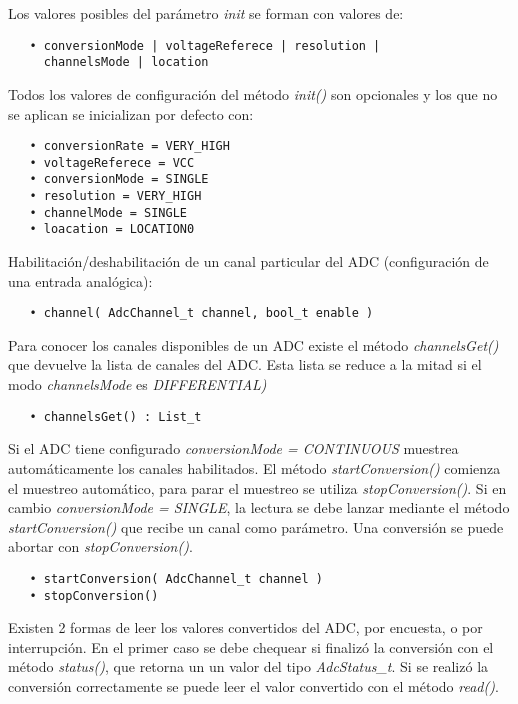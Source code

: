 Los valores posibles del parámetro \emph{init} se forman con valores de:

\begin{verbatim}
   • conversionMode | voltageReferece | resolution | 
     channelsMode | location
\end{verbatim}

Todos los valores de configuración del método \emph{init()} son opcionales y los que no se aplican se inicializan por defecto con:

\begin{verbatim}
   • conversionRate = VERY_HIGH
   • voltageReferece = VCC
   • conversionMode = SINGLE
   • resolution = VERY_HIGH
   • channelMode = SINGLE
   • loacation = LOCATION0
\end{verbatim}

Habilitación/deshabilitación de un canal particular del ADC (configuración de una entrada analógica):

\begin{verbatim}
   • channel( AdcChannel_t channel, bool_t enable )
\end{verbatim}

Para conocer los canales disponibles de un ADC existe el método 
\emph{channelsGet()} que devuelve la lista de canales del ADC. Esta lista se reduce a la mitad si el modo \emph{channelsMode} es \emph{DIFFERENTIAL)}

\begin{verbatim}
   • channelsGet() : List_t
\end{verbatim}

Si el ADC tiene configurado \emph{conversionMode = CONTINUOUS} muestrea automáticamente los canales habilitados. El método \emph{startConversion()} comienza el muestreo automático, para parar el muestreo se utiliza \emph{stopConversion()}. Si en cambio \emph{conversionMode = SINGLE}, la lectura se debe lanzar mediante el método \emph{startConversion()} que recibe un canal como parámetro. 
Una conversión se puede abortar con \emph{stopConversion()}.

\begin{verbatim}
   • startConversion( AdcChannel_t channel )
   • stopConversion()
\end{verbatim}

Existen 2 formas de leer los valores convertidos del ADC, por encuesta, o por interrupción. En el primer caso se debe chequear si finalizó la conversión con el método \emph{status()}, que retorna un un valor del tipo \emph{AdcStatus\_t}. Si se realizó la conversión correctamente se puede leer el valor convertido con el método \emph{read()}.

